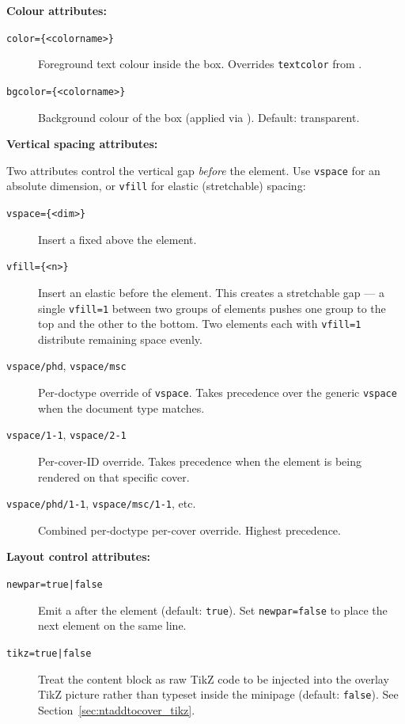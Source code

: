\medskip
\noindent\textbf{Colour attributes:}

\begin{description}
  \item[\texttt{color=\{<colorname>\}}] Foreground text colour inside the box.
        Overrides \texttt{textcolor} from \latexinline{\thesiscover}.
  \item[\texttt{bgcolor=\{<colorname>\}}] Background colour of the box
        (applied via ).  Default: transparent.
\end{description}

\medskip
\noindent\textbf{Vertical spacing attributes:}

Two attributes control the vertical gap \emph{before} the element.  Use
\texttt{vspace} for an absolute dimension, or \texttt{vfill} for elastic
(stretchable) spacing:

\begin{description}
  \item[\texttt{vspace=\{<dim>\}}] Insert a fixed \latexinline{\vspace*{<dim>}} above
        the element.
  \item[\texttt{vfill=\{<n>\}}] Insert an elastic 
        before the element.  This creates a stretchable gap — a single
        \texttt{vfill=1} between two groups of elements pushes one group to
        the top and the other to the bottom.  Two elements each with
        \texttt{vfill=1} distribute remaining space evenly.
  \item[\texttt{vspace/phd}, \texttt{vspace/msc}] Per-doctype override of
        \texttt{vspace}.  Takes precedence over the generic \texttt{vspace}
        when the document type matches.
  \item[\texttt{vspace/1-1}, \texttt{vspace/2-1}] Per-cover-ID override.
        Takes precedence when the element is being rendered on that specific
        cover.
  \item[\texttt{vspace/phd/1-1}, \texttt{vspace/msc/1-1}, etc.] Combined
        per-doctype per-cover override.  Highest precedence.
\end{description}

\medskip
\noindent\textbf{Layout control attributes:}

\begin{description}
  \item[\texttt{newpar=true|false}] Emit a \latexinline{\par} after the element
        (default: \texttt{true}).  Set \texttt{newpar=false} to place the
        next element on the same line.
  \item[\texttt{tikz=true|false}] Treat the content block as raw TikZ code to
        be injected into the overlay TikZ picture rather than typeset inside
        the minipage (default: \texttt{false}).  See
        Section~\ref{sec:ntaddtocover_tikz}.
\end{description}


